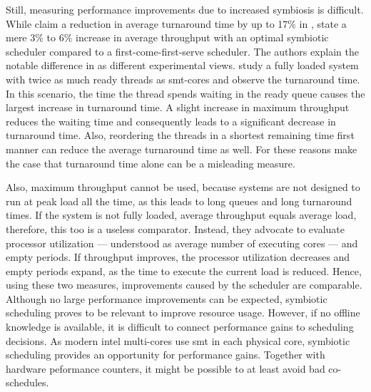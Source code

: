 Still, measuring performance improvements due to increased symbiosis is
difficult.
While \citeauthor{snavely_symbiotic_2000} claim a reduction in average
turnaround time by up to 17\% in \cite{snavely_symbiotic_2000},
\citeauthor{eyerman_revisiting_2015} state a mere 3\% to 6\% increase in
average throughput with an optimal symbiotic scheduler compared to a
first-come-first-serve scheduler.
The authors explain the notable difference in \cite{eyerman_revisiting_2015} as
different experimental views.
\citeauthor{snavely_symbiotic_2000} study a fully loaded system with twice
as much ready threads as \gls{smt}-cores and observe the turnaround time.
In this scenario, the time the thread spends waiting in the ready queue causes the
largest increase in turnaround time.
A slight increase in maximum throughput reduces the waiting time and
consequently leads to a significant decrease in turnaround time.
Also, reordering the threads in a shortest remaining time first manner can
reduce the average turnaround time as well.
For these reasons \citeauthor{eyerman_revisiting_2015} make the case
that turnaround time alone can be a misleading measure.

Also, maximum throughput cannot be used, because systems are not
designed to run at peak load all the time, as this leads to long queues and
long turnaround times.
If the system is not fully loaded, average throughput equals average load,
therefore, this too is a useless comparator.
Instead, they advocate to evaluate processor utilization --- understood as average
number of executing cores --- and empty periods.
If throughput improves, the processor utilization decreases and empty
periods expand, as the time to execute the current load is reduced.
Hence, using these two measures, improvements caused by the scheduler are
comparable.
\\

Although no large performance improvements can be expected, symbiotic
scheduling proves to be relevant to improve resource usage.
However, if no offline knowledge is available, it is difficult to connect performance
gains to scheduling decisions.
As modern \gls{intel} multi-cores use \gls{smt} in each physical core, symbiotic
scheduling provides an opportunity for performance gains.
Together with hardware peformance counters, it might be possible to at least
avoid bad co-schedules.
\\

